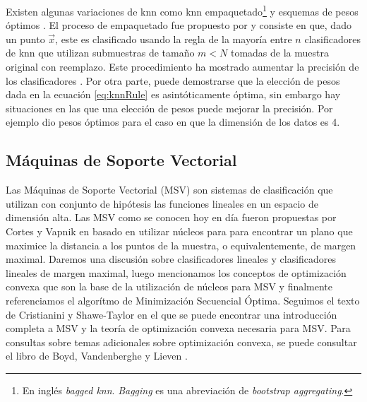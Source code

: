 \documentclass[letterpaper,12pt]{book}
\begin{document}
Existen algunas variaciones de knn como knn empaquetado\footnote{En inglés \textit{bagged knn}. \textit{Bagging} es una abreviación de \textit{bootstrap aggregating}.} \cite{breiman_heuristics_1996, breiman_bagging_1996} y esquemas de pesos óptimos \cite{samworth_optimal_2012}. El proceso de empaquetado fue propuesto por \cite{breiman_heuristics_1996, breiman_bagging_1996} y consiste en que, dado un punto $\vec{x}$, este es clasificado usando la regla de la mayoría entre $n$ clasificadores de knn que utilizan submuestras de tamaño $m<N$ tomadas de la muestra original con reemplazo. Este procedimiento ha mostrado aumentar la precisión de los clasificadores \cite{breiman_bagging_1996}. Por otra parte, puede demostrarse que la elección de pesos dada en la ecuación \ref{eq:knnRule} es asintóticamente óptima, sin embargo hay situaciones en las que una elección de pesos puede mejorar la precisión. Por ejemplo \cite{samworth_optimal_2012} dio pesos óptimos para el caso en que la dimensión de los datos es 4. 

\subsection{Máquinas de Soporte Vectorial}

Las Máquinas de Soporte Vectorial (MSV) son sistemas de clasificación que utilizan con conjunto de hipótesis las funciones lineales en un espacio de dimensión alta. Las MSV como se conocen hoy en día fueron propuestas por Cortes y Vapnik en \cite{cortes_support-vector_1995} basado en utilizar núcleos para para encontrar un plano que maximice la distancia a los puntos de la muestra, o equivalentemente, de margen maximal. Daremos una discusión sobre clasificadores lineales y clasificadores lineales de margen maximal, luego mencionamos los conceptos de optimización convexa que son la base de la utilización de núcleos para MSV y finalmente referenciamos el algorítmo de Minimización Secuencial Óptima. Seguimos el texto de Cristianini y Shawe-Taylor \cite{cristianini_introduction_2000} en el que se puede encontrar una introducción completa a MSV y la teoría de optimización convexa necesaria para MSV. Para consultas sobre temas adicionales sobre optimización convexa, se puede consultar el libro de Boyd, Vandenberghe y Lieven \cite{boyd_convex_2004}.
\end{document}
